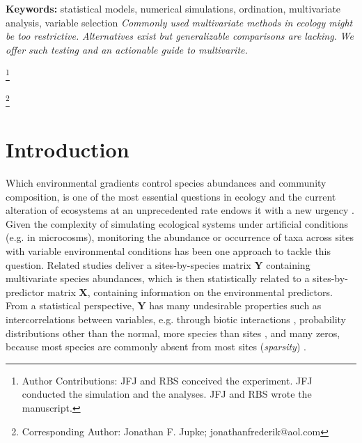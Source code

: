 \documentclass[a4paper,11pt]{article}
\newcommand\blfootnote[1]{%
  \begingroup
  \renewcommand\thefootnote{}\footnote{#1}%
  \addtocounter{footnote}{-1}%
  \endgroup
}
\begin{document}

        {\bf Keywords:} 
        statistical models,
        numerical simulations,
        ordination, 
        multivariate analysis, 
        variable selection
    \newpage
        \textit{Commonly used multivariate methods in ecology might be too restrictive.} 
        \textit{Alternatives exist but generalizable comparisons are lacking.}
        \textit{We offer such testing and an actionable guide to multivarite.}
        
        \blfootnote{Author Contributions: JFJ and RBS conceived the experiment. JFJ conducted the simulation and the analyses. JFJ and RBS wrote the manuscript.}
        \blfootnote{Corresponding Author: Jonathan F. Jupke; jonathanfrederik@aol.com}

\newpage

\section{Introduction}


	Which environmental gradients control species abundances and community composition, is one of the most essential questions in ecology \citep[e.g.][]{Clements1907}  and the current alteration of ecosystems at an unprecedented rate endows it with a new urgency \citep{pacifici2015assessing}. 
	Given the complexity of simulating ecological systems under artificial conditions (e.g. in microcosms), monitoring the abundance or occurrence of taxa across sites with variable  environmental conditions has been one approach to tackle this question.
	Related studies deliver a sites-by-species matrix $\mathbf{Y}$ containing multivariate species abundances, which is then statistically related to  a sites-by-predictor matrix $\mathbf{X}$, containing information on the environmental predictors.
	From a statistical perspective, $\mathbf{Y}$ has many undesirable properties such as
	intercorrelations between variables, 
	e.g. through biotic interactions \citep{morales2015inferring},
	probability distributions other than the normal, 
	more species than sites \citep[\textit{high dimensionality}, especially in DNA barcoding studies, ][]{cristescu2014barcoding},  
	and many zeros, because most species are commonly absent from most sites (\textit{sparsity}) \citep{mcgill2007species}. 
	
\end{document}
